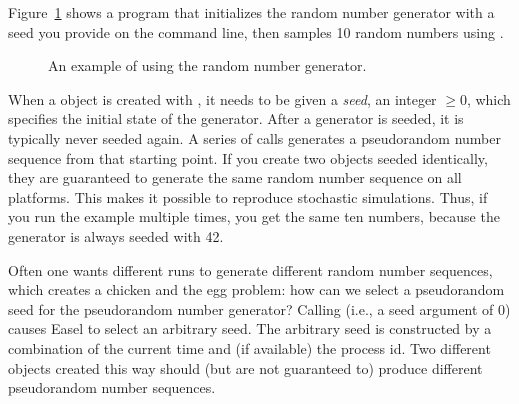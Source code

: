Figure~\ref{fig:random_example} shows a program that initializes the
random number generator with a seed you provide on the command line,
then samples 10 random numbers using .

\begin{figure}

\caption{An example of using the random number generator.}
\label{fig:random_example}
\end{figure}

When a  object is created with
, it needs to be given a \emph{seed},
an integer $\geq 0$, which specifies the initial state of the
generator. After a generator is seeded, it is typically never seeded
again. A series of  calls generates a
pseudorandom number sequence from that starting point. If you create
two  objects seeded identically, they are
guaranteed to generate the same random number sequence on all
platforms. This makes it possible to reproduce stochastic simulations.
Thus, if you run the example multiple times, you get the same ten
numbers, because the generator is always seeded with 42.

Often one wants different runs to generate different random number
sequences, which creates a chicken and the egg problem: how can we
select a pseudorandom seed for the pseudorandom number generator?
Calling  (i.e., a seed argument of
0) causes Easel to select an arbitrary seed. The arbitrary seed is
constructed by a combination of the current time and (if available)
the process id. Two different  objects created
this way should (but are not guaranteed to) produce different
pseudorandom number sequences.


